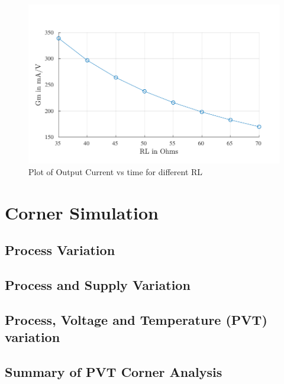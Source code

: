 \begin{figure} [H]
\centering
\includegraphics[scale=1]{Figures/Plots/Ov_Gm_RL.pdf}
\caption{Plot of Output Current vs time for different RL}
\end{figure}

\section{Corner Simulation}
\subsection{Process Variation}
\subsection{Process and Supply Variation}
\subsection{Process, Voltage and Temperature (PVT) variation}
\subsection{Summary of PVT Corner Analysis}